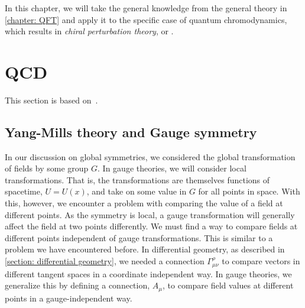 In this chapter, we will take the general knowledge from the general theory in \autoref{chapter: QFT} and apply it to the specific case of quantum chromodynamics, which results in \emph{chiral perturbation theory}, or \chpt.

\section{QCD}
This section is based on~\autocite{peskinIntroductionQuantumField1995,schererIntroductionChiralPerturbation2002,schwartzQuantumFieldTheory2013}.

\subsection{Yang-Mills theory and Gauge symmetry}


In our discussion on global symmetries, we considered the global transformation of fields by some group $G$.
In gauge theories, we will consider local transformations.
That is, the transformations are themselves functions of spacetime, $U = U(x)$, and take on some value in $G$ for all points in space.
With this, however, we encounter a problem with comparing the value of a field at different points.
As the symmetry is local, a gauge transformation will generally affect the field at two points differently.
We must find a way to compare fields at different points independent of gauge transformations.
This is similar to a problem we have encountered before.
In differential geometry, as described in \autoref{section: differential geometry}, we needed a connection $\Gamma^\rho_{\mu \nu}$ to compare vectors in different tangent spaces in a coordinate independent way.
In gauge theories, we generalize this by defining a connection, $A_\mu$, to compare field values at different points in a gauge-independent way.

